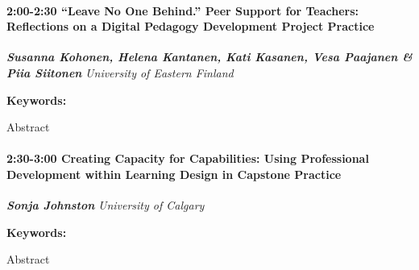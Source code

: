 \documentclass[
]{book}
\begin{document}
\begin{session}
\hypertarget{leave-no-one-behind.-peer-support-for-teachers-reflections-on-a-digital-pedagogy-development-project-practice}{%
\paragraph*{\texorpdfstring{2:00-2:30 \textbar{} \textbf{``Leave No One
Behind.'' Peer Support for Teachers: Reflections on a Digital Pedagogy
Development Project} \textbar{}
Practice}{2:00-2:30 \textbar{} ``Leave No One Behind.'' Peer Support for Teachers: Reflections on a Digital Pedagogy Development Project \textbar{} Practice}}\label{leave-no-one-behind.-peer-support-for-teachers-reflections-on-a-digital-pedagogy-development-project-practice}}

\textbf{\emph{Susanna Kohonen, Helena Kantanen, Kati Kasanen, Vesa
Paajanen \& Piia Siitonen}} \textbar{} \emph{University of Eastern
Finland}

\textbf{Keywords:}

Abstract
\end{session}
\begin{session}
\hypertarget{creating-capacity-for-capabilities-using-professional-development-within-learning-design-in-capstone-practice}{%
\paragraph*{\texorpdfstring{2:30-3:00 \textbar{} \textbf{Creating
Capacity for Capabilities: Using Professional Development within
Learning Design in Capstone} \textbar{}
Practice}{2:30-3:00 \textbar{} Creating Capacity for Capabilities: Using Professional Development within Learning Design in Capstone \textbar{} Practice}}\label{creating-capacity-for-capabilities-using-professional-development-within-learning-design-in-capstone-practice}}

\textbf{\emph{Sonja Johnston}} \textbar{} \emph{University of Calgary}

\textbf{Keywords:}

Abstract
\end{session}
\end{document}
